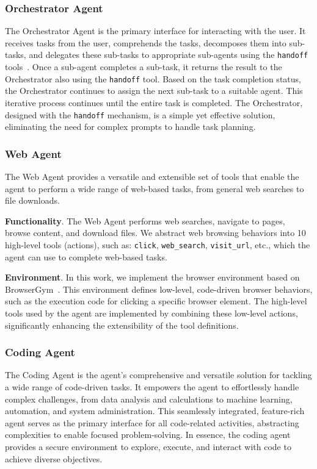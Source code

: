\subsubsection{Orchestrator Agent}
The Orchestrator Agent is the primary interface for interacting with the user. It receives tasks from the user, comprehends the tasks, decomposes them into sub-tasks, and delegates these sub-tasks to appropriate sub-agents using the \texttt{handoff} tools~\cite{openai2023swarm}. Once a sub-agent completes a sub-task, it returns the result to the Orchestrator also using the \texttt{handoff} tool. Based on the task completion status, the Orchestrator continues to assign the next sub-task to a suitable agent. This iterative process continues until the entire task is completed. The Orchestrator, designed with the \texttt{handoff} mechanism, is a simple yet effective solution, eliminating the need for complex prompts to handle task planning.

\subsubsection{Web Agent}
The Web Agent provides a versatile and extensible set of tools that enable the agent to perform a wide range of web-based tasks, from general web searches to file downloads.

\noindent \textbf{Functionality}. The Web Agent performs web searches, navigate to pages, browse content, and download files. We abstract web browsing behaviors into 10 high-level tools (actions), such as: \texttt{click}, \texttt{web\_search}, \texttt{visit\_url}, etc., which the agent can use to complete web-based tasks.

\textbf{Environment}. In this work, we implement the browser environment based on BrowserGym~\cite{workarena2024}. This environment defines low-level, code-driven browser behaviors, such as the execution code for clicking a specific browser element. The high-level tools used by the agent are implemented by combining these low-level actions, significantly enhancing the extensibility of the tool definitions.

\subsubsection{Coding Agent}
The Coding Agent is the agent's comprehensive and versatile solution for tackling a wide range of code-driven tasks. It empowers the agent to effortlessly handle complex challenges, from data analysis and calculations to machine learning, automation, and system administration. This seamlessly integrated, feature-rich agent serves as the primary interface for all code-related activities, abstracting complexities to enable focused problem-solving. In essence, the coding agent provides a secure environment to explore, execute, and interact with code to achieve diverse objectives.

